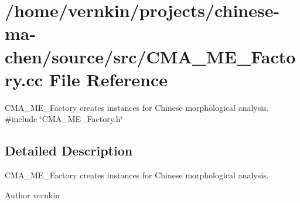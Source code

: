 \section{/home/vernkin/projects/chinese-\/ma-\/chen/source/src/CMA\_\-ME\_\-Factory.cc File Reference}
\label{CMA__ME__Factory_8cc}


CMA\_\-ME\_\-Factory creates instances for Chinese morphological analysis.  
{\ttfamily \#include \char`\"{}CMA\_\-ME\_\-Factory.h\char`\"{}}\par


\subsection{Detailed Description}
CMA\_\-ME\_\-Factory creates instances for Chinese morphological analysis. \begin{DoxyAuthor}{Author}
vernkin 
\end{DoxyAuthor}
